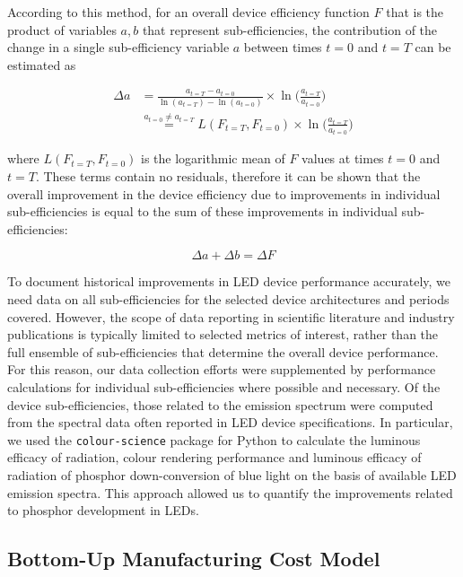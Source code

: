 \documentclass[twoside,twocolumn,9pt]{article}
\begin{document}
According to this method, for an overall device efficiency function $F$ that is the product of variables $a, b$ that represent sub-efficiencies, the contribution of the change in a single sub-efficiency variable $a$ between times $t=0$ and $t=T$ can be estimated as \cite{Ang2019}

\begin{align}
    \Delta a &= \frac{a_{t=T} - a_{t=0}}{\ln(a_{t=T}) - \ln(a_{t=0})} \times \ln \big ( \frac{a_{t=T}}{a_{t=0}} \big ) \\
    & \stackrel{a_{t=0} \neq a_{t=T}}{=} L(F_{t=T}, F_{t=0}) \times \ln \big ( \frac{a_{t=T}}{a_{t=0}} \big )
\end{align}

where $L(F_{t=T}, F_{t=0})$ is the logarithmic mean of $F$ values at times $t=0$ and $t=T$. These terms contain no residuals, therefore it can be shown that the overall improvement in the device efficiency due to improvements in individual sub-efficiencies is equal to the sum of these improvements in individual sub-efficiencies: 

\begin{equation}
    \Delta a + \Delta b  = \Delta F
\end{equation}

To document historical improvements in LED device performance accurately, we need data on all sub-efficiencies for the selected device architectures and periods covered. However, the scope of data reporting in scientific literature and industry publications is typically limited to selected metrics of interest, rather than the full ensemble of sub-efficiencies that determine the overall device performance. For this reason, our data collection efforts were supplemented by performance calculations for individual sub-efficiencies where possible and necessary. Of the device sub-efficiencies, those related to the emission spectrum  were computed from the spectral data often reported in LED device specifications. In particular, we used the \texttt{colour-science} package for Python\cite{python-colour} to calculate the luminous efficacy of radiation, colour rendering performance and luminous efficacy of radiation of phosphor down-conversion of blue light on the basis of available LED emission spectra. This approach allowed us to  quantify the improvements related to phosphor development in LEDs. 

\subsection{Bottom-Up Manufacturing Cost Model}
\label{sec:costmodel}
\end{document}
